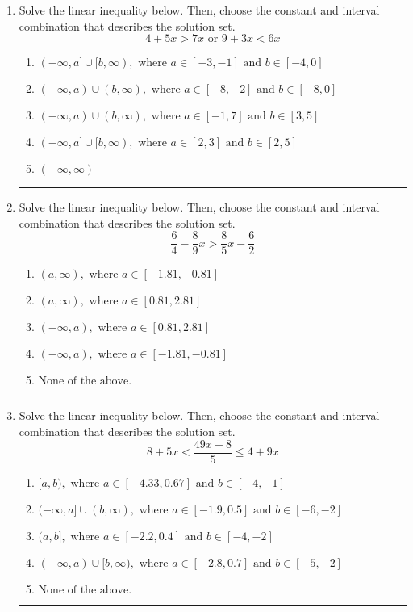 \documentclass[14pt]{extbook}
\newcommand{\litem}[1]{\item#1\hspace*{-1cm}\rule{\textwidth}{0.4pt}}
\begin{document}
\begin{enumerate}
\litem{
Solve the linear inequality below. Then, choose the constant and interval combination that describes the solution set.\[ 4 + 5 x > 7 x \text{ or } 9 + 3 x < 6 x \]\begin{enumerate}[label=\Alph*.]
\item \( (-\infty, a] \cup [b, \infty), \text{ where } a \in [-3, -1] \text{ and } b \in [-4, 0] \)
\item \( (-\infty, a) \cup (b, \infty), \text{ where } a \in [-8, -2] \text{ and } b \in [-8, 0] \)
\item \( (-\infty, a) \cup (b, \infty), \text{ where } a \in [-1, 7] \text{ and } b \in [3, 5] \)
\item \( (-\infty, a] \cup [b, \infty), \text{ where } a \in [2, 3] \text{ and } b \in [2, 5] \)
\item \( (-\infty, \infty) \)

\end{enumerate} }
\litem{
Solve the linear inequality below. Then, choose the constant and interval combination that describes the solution set.\[ \frac{6}{4} - \frac{8}{9} x > \frac{8}{5} x - \frac{6}{2} \]\begin{enumerate}[label=\Alph*.]
\item \( (a, \infty), \text{ where } a \in [-1.81, -0.81] \)
\item \( (a, \infty), \text{ where } a \in [0.81, 2.81] \)
\item \( (-\infty, a), \text{ where } a \in [0.81, 2.81] \)
\item \( (-\infty, a), \text{ where } a \in [-1.81, -0.81] \)
\item \( \text{None of the above}. \)

\end{enumerate} }
\litem{
Solve the linear inequality below. Then, choose the constant and interval combination that describes the solution set.\[ 8 + 5 x < \frac{49 x + 8}{5} \leq 4 + 9 x \]\begin{enumerate}[label=\Alph*.]
\item \( [a, b), \text{ where } a \in [-4.33, 0.67] \text{ and } b \in [-4, -1] \)
\item \( (-\infty, a] \cup (b, \infty), \text{ where } a \in [-1.9, 0.5] \text{ and } b \in [-6, -2] \)
\item \( (a, b], \text{ where } a \in [-2.2, 0.4] \text{ and } b \in [-4, -2] \)
\item \( (-\infty, a) \cup [b, \infty), \text{ where } a \in [-2.8, 0.7] \text{ and } b \in [-5, -2] \)
\item \( \text{None of the above.} \)


\end{enumerate}}
\end{enumerate}
\end{document}
